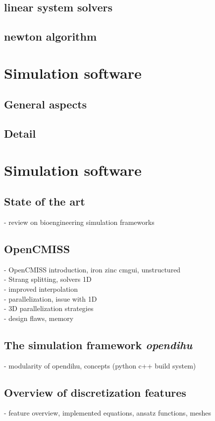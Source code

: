     \section{linear system solvers}
    \section{newton algorithm}
    
  \chapter{Simulation software}
    \section{General aspects}
    \section{Detail}
  \chapter{Simulation software}
    \section{State of the art}
    - review on bioengineering simulation frameworks 
    
    \section{OpenCMISS}
  - OpenCMISS introduction, iron zinc cmgui, unstructured\\
  
  - Strang splitting, solvers 1D\\
  - improved interpolation\\
  - parallelization, issue with 1D \\
  - 3D parallelization strategies\\
  - design flaws, memory\\
    \section{The simulation framework \emph{opendihu}}
    - modularity of opendihu, concepts (python c++ build system)
    \section{Overview of discretization features}
    - feature overview, implemented equations, ansatz functions, meshes
